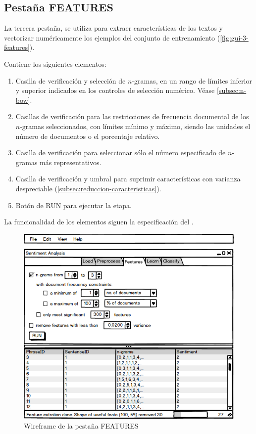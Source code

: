 \FloatBarrier
\newpage
\subsection{Pestaña FEATURES}

La tercera pestaña,  se utiliza para extraer características de los textos y vectorizar numéricamente los ejemplos del conjunto de entrenamiento (\autoref{fig:gui-3-features}).

Contiene los siguientes elementos:
\begin{enumerate}
\item Casilla de verificación y selección de $n$-gramas, en un rango de límites inferior y superior indicados en los controles de selección numérico. Véase \autoref{subsec:n-bow}.
\item Casillas de verificación para las restricciones de frecuencia documental de los $n$-gramas seleccionados, con límites mínimo y máximo, siendo las unidades el número de documentos o el porcentaje relativo.
\item Casilla de verificación para seleccionar sólo el número especificado de $n$-gramas más representativos.
\item Casilla de verificación y umbral para suprimir características con varianza despreciable (\autoref{subsec:reduccion-caracteristicas}).
\item Botón de RUN para ejecutar la etapa.
\end{enumerate}

La funcionalidad de los elementos siguen la especificación del .

\begin{figure}[htbp]
\centering
\includegraphics[width=12cm]{gui-3-features}
\caption{Wireframe de la pestaña FEATURES}
\label{fig:gui-3-features}
\end{figure}

